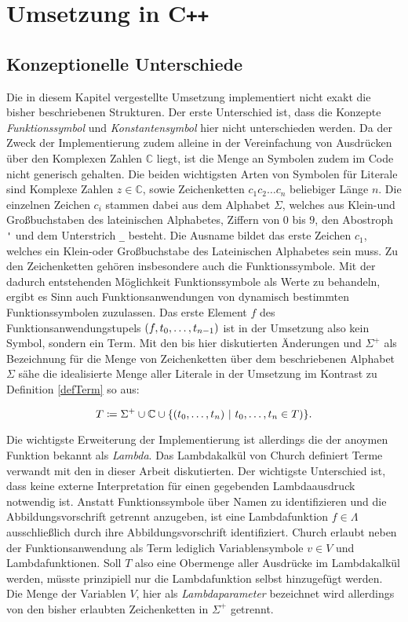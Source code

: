

\section{Umsetzung in C\texttt{++}} \label{secKernUmsetzungInCpp}

\subsection{Konzeptionelle Unterschiede}
Die in diesem Kapitel vergestellte Umsetzung implementiert nicht exakt die bisher beschriebenen Strukturen. Der erste Unterschied ist, dass die Konzepte \emph{Funktionssymbol} und \emph{Konstantensymbol} hier nicht unterschieden werden. Da der Zweck der Implementierung zudem alleine in der Vereinfachung von Ausdrücken über den Komplexen Zahlen $\mathbb C$ liegt, ist die Menge an Symbolen zudem im Code nicht generisch gehalten. Die beiden wichtigsten Arten von Symbolen für Literale sind Komplexe Zahlen $z \in \mathbb C$, sowie Zeichenketten $c_1 c_2\dots c_n$ beliebiger Länge $n$. Die einzelnen Zeichen $c_i$ stammen dabei aus dem Alphabet $\Sigma$, welches aus Klein-und Großbuchstaben des lateinischen Alphabetes, Ziffern von $0$ bis $9$, den Abostroph \verb|'| und dem Unterstrich \verb|_| besteht. Die Ausname bildet das erste Zeichen $c_1$, welches ein Klein-oder Großbuchstabe des Lateinischen Alphabetes sein muss. Zu den Zeichenketten gehören insbesondere auch die Funktionssymbole. Mit der dadurch entstehenden Möglichkeit Funktionssymbole als Werte zu behandeln, ergibt es Sinn auch Funktionsanwendungen von dynamisch bestimmten Funktionssymbolen zuzulassen. Das erste Element $f$ des Funktionsanwendungstupels $(f, {t}_{0}, \dots, {t}_{n-1})$ ist in der Umsetzung also kein Symbol, sondern ein Term. Mit den bis hier diskutierten Änderungen und $\Sigma^+$ als Bezeichnung für die Menge von Zeichenketten über dem beschriebenen Alphabet $\Sigma$ sähe die idealisierte Menge aller Literale in der Umsetzung im Kontrast zu Definition \ref{defTerm} so aus:

$$T \coloneqq \Sigma^+ \cup \mathbb C \cup \curl*{(\elems t 0 n)~|~ \elems t 0 n \in T)}.$$

Die wichtigste Erweiterung der Implementierung ist allerdings die der anoymen Funktion bekannt als \emph{Lambda}. Das Lambdakalkül von Church \cite{ChurchLambda36} definiert Terme verwandt mit den in dieser Arbeit diskutierten. Der wichtigste Unterschied ist, dass keine externe Interpretation für einen gegebenden Lambdaausdruck notwendig ist. Anstatt Funktionssymbole über Namen zu identifizieren und die Abbildungsvorschrift getrennt anzugeben, ist eine Lambdafunktion $f \in \Lambda$ ausschließlich durch ihre Abbildungsvorschrift identifiziert. Church erlaubt neben der Funktionsanwendung als Term lediglich Variablensymbole  $v \in V$ und Lambdafunktionen. Soll $T$ also eine Obermenge aller Ausdrücke im Lambdakalkül werden, müsste prinzipiell nur die Lambdafunktion selbst hinzugefügt werden. Die Menge der Variablen $V$, hier als \emph{Lambdaparameter} bezeichnet wird allerdings von den bisher erlaubten Zeichenketten in $\Sigma^+$ getrennt.

